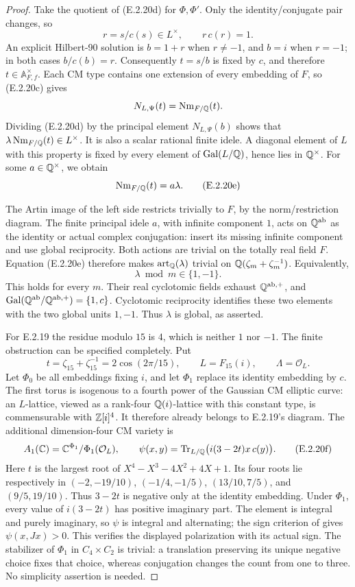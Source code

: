 \begin{proof}
Take the quotient of (E.2.20d) for \(\Phi,\Phi'\).
Only the identity/conjugate pair changes, so
\[
 r=s/c(s)\in L^\times,\qquad r\,c(r)=1.
\]
An explicit Hilbert-90 solution is
\(b=1+r\) when \(r\ne-1\), and \(b=i\) when \(r=-1\);
in both cases \(b/c(b)=r\).
Consequently \(t=s/b\) is fixed by \(c\), and therefore
\(t\in\mathbb A_{F,f}^{\times}\).
Each CM type contains one extension of every embedding
of \(F\), so (E.2.20c) gives
\[
 N_{L,\Psi}(t)=\operatorname{Nm}_{F/\mathbb Q}(t).
\]
Dividing (E.2.20d) by the principal element
\(N_{L,\Psi}(b)\) shows that
\(\lambda\operatorname{Nm}_{F/\mathbb Q}(t)\in L^\times\).
It is also a scalar rational finite idele. A diagonal
element of \(L\) with this property is fixed by every
element of \(\operatorname{Gal}(L/\mathbb Q)\), hence lies in \(\mathbb Q^\times\).
For some \(a\in\mathbb Q^\times\), we obtain
\[
 \operatorname{Nm}_{F/\mathbb Q}(t)=a\lambda.
 \tag{E.2.20e}
\]

The Artin image of the left side restricts trivially
to \(F\), by the norm/restriction diagram.
The finite principal idele \(a\), with infinite
component \(1\), acts on \(\mathbb Q^{\mathrm{ab}}\) as
the identity or actual complex conjugation:
insert its missing infinite component and use
global reciprocity. Both actions are trivial on
the totally real field \(F\).
Equation (E.2.20e) therefore makes
\(\operatorname{art}_{\mathbb Q}(\lambda)\) trivial on
\(\mathbb Q(\zeta_m+\zeta_m^{-1})\). Equivalently,
\[
 \lambda\bmod m\in\{1,-1\}.
\]
This holds for every \(m\). Their real cyclotomic
fields exhaust \(\mathbb Q^{\mathrm{ab},+}\), and
\(\operatorname{Gal}(\mathbb Q^{\mathrm{ab}}/\mathbb Q^{\mathrm{ab},+})
=\{1,c\}\). Cyclotomic reciprocity identifies these
two elements with the two global units \(1,-1\).
Thus \(\lambda\) is global, as asserted.

For E.2.19 the residue modulo \(15\) is \(4\), which
is neither \(1\) nor \(-1\). The finite obstruction
can be specified completely. Put
\[
 t=\zeta_{15}+\zeta_{15}^{-1}
   =2\cos(2\pi/15),\qquad L=F_{15}(i),\qquad
 \Lambda=\mathcal O_L.
\]
Let \(\Phi_0\) be all embeddings fixing \(i\), and let
\(\Phi_1\) replace its identity embedding by \(c\).
The first torus is isogenous to a fourth power of
the Gaussian CM elliptic curve: an \(L\)-lattice,
viewed as a rank-four \(\mathbb Q(i)\)-lattice with this
constant type, is commensurable with \(\mathbb Z[i]^4\).
It therefore already belongs to E.2.19's diagram.
The additional dimension-four CM variety is
\[
 A_1(\mathbb C)=\mathbb C^{\Phi_1}/\Phi_1(\mathcal O_L),\qquad
 \psi(x,y)=\operatorname{Tr}_{L/\mathbb Q}
       \bigl(i(3-2t)x\,c(y)\bigr).
 \tag{E.2.20f}
\]
Here \(t\) is the largest root of
\(X^4-X^3-4X^2+4X+1\). Its four roots lie respectively
in \((-2,-19/10)\), \((-1/4,-1/5)\),
\((13/10,7/5)\), and \((9/5,19/10)\).
Thus \(3-2t\) is negative only at the identity
embedding. Under \(\Phi_1\), every value of
\(i(3-2t)\) has positive imaginary part.
The element is integral and purely imaginary, so
\(\psi\) is integral and alternating; the sign
criterion of \cite[Example 2.9, pp.~25--26]{GenMilneCM2020}
gives \(\psi(x,Jx)>0\). This verifies the displayed
polarization with its actual sign.
The stabilizer of \(\Phi_1\) in \(C_4\times C_2\)
is trivial: a translation preserving its unique
negative choice fixes that choice, whereas
conjugation changes the count from one to three.
No simplicity assertion is needed.


\end{proof}
